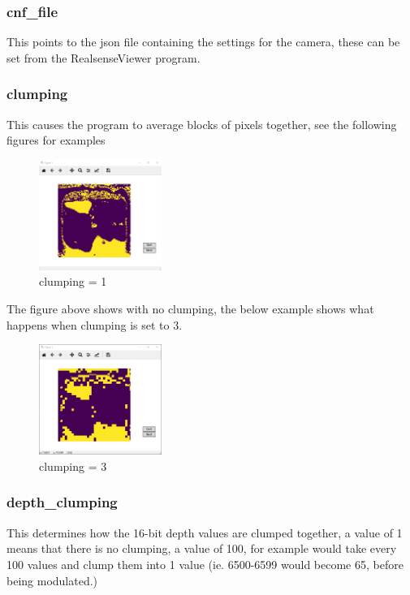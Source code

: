 \documentclass{article}
\begin{document}
					\subsubsection{cnf\_file}
						This points to the json file containing the settings for the camera, these can be set from the RealsenseViewer program.
						
					\newpage
					\subsubsection{clumping}
						This causes the program to average blocks of pixels together, see the following figures for examples
						
						\begin{figure}[h]
							\includegraphics[width=4cm]{./images/code_display_example.png}
							\centering
							\caption{clumping = 1}
							\label{fig:clumpingexample1}
						\end{figure}
					
						The figure above shows with no clumping, the below example shows what happens when clumping is set to 3.
					
						\begin{figure}[h]
							\includegraphics[width=4cm]{./images/code_clumping_example.png}
							\centering
							\caption{clumping = 3}
							\label{fig:clumpingexample3}
						\end{figure}
					
					\subsubsection{depth\_clumping}
						This determines how the 16-bit depth values are clumped together, a value of 1 means that there is no clumping, a value of 100, for example would take every 100 values and clump them into 1 value (ie. 6500-6599 would become 65, before being modulated.)
						
\end{document}
